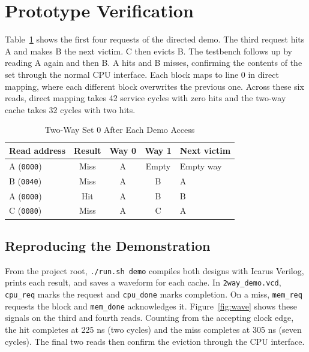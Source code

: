 \section{Prototype Verification}
Table~\ref{tab:lru} shows the first four requests of the directed demo.
The third request hits A and makes B the next victim. C then evicts B.
The testbench follows up by reading A again and then B. A hits and B
misses, confirming the contents of the set through the normal CPU interface.
Each block maps to line 0 in direct mapping, where each different block
overwrites the previous one. Across these six reads, direct mapping
takes 42 service cycles with zero hits and the two-way cache takes
32 cycles with two hits.

\begin{table}[!t]
\caption{Two-Way Set 0 After Each Demo Access}
\label{tab:lru}
\centering
\footnotesize
\begin{tabular}{lcccl}
\toprule
Read address & Result & Way 0 & Way 1 & Next victim\\
\midrule
A (\texttt{0000}) & Miss & A & Empty & Empty way\\
B (\texttt{0040}) & Miss & A & B & A\\
A (\texttt{0000}) & Hit & A & B & B\\
C (\texttt{0080}) & Miss & A & C & A\\
\bottomrule
\end{tabular}
\end{table}

\subsection{Reproducing the Demonstration}
From the project root, \texttt{./run.sh demo} compiles both designs with
Icarus Verilog, prints each result, and saves a waveform for each cache.
In \texttt{2way\_demo.vcd}, \texttt{cpu\_req} marks the request
and \texttt{cpu\_done} marks completion. On a miss, \texttt{mem\_req}
requests the block and \texttt{mem\_done} acknowledges it. Figure~\ref{fig:wave}
shows these signals on the third and fourth reads. Counting from the
accepting clock edge, the hit completes at 225 ns (two cycles) and the
miss completes at 305 ns (seven cycles). The final two reads then
confirm the eviction through the CPU interface.

